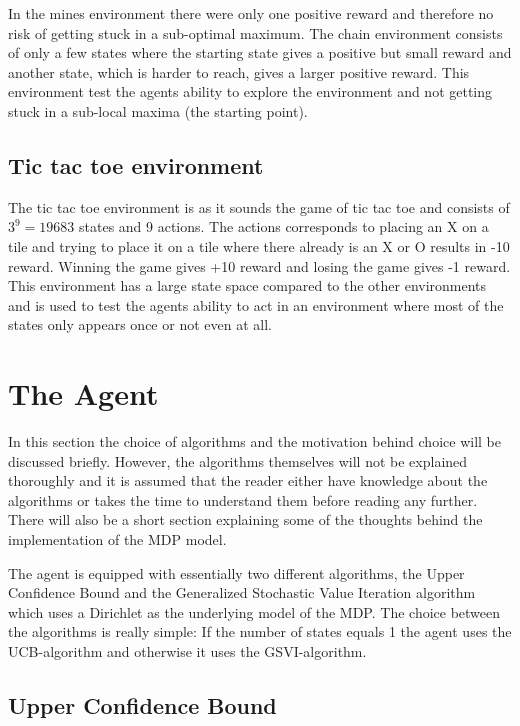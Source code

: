 \documentclass[11pt]{article}
\numberwithin{equation}{section}
\begin{document}
\begin{flushleft}
In the mines environment there were only one positive reward and therefore no risk of getting stuck in a sub-optimal maximum. The chain environment consists of only a few states where the starting state gives a positive but small reward and another state, which is harder to reach, gives a larger positive reward. This environment test the agents ability to explore the environment and not getting stuck in a sub-local maxima (the starting point).
\subsection{Tic tac toe environment}

The tic tac toe environment is as it sounds the game of tic tac toe and consists of $3^9=19683$ states and 9 actions. The actions corresponds to placing an X on a tile and trying to place it on a tile where there already is an X or O results in -10 reward. Winning the game gives +10 reward and losing the game gives -1 reward. This environment has a large state space compared to the other environments and is used to test the agents ability to act in an environment where most of the states only appears once or not even at all.

\section{The Agent}

In this section the choice of algorithms and the motivation behind choice will be discussed briefly. However, the algorithms themselves will not be explained thoroughly and it is assumed that the reader either have knowledge about the algorithms or takes the time to understand them before reading any further. There will also be a short section explaining some of the thoughts behind the implementation of the MDP model. \newline

The agent is equipped with essentially two different algorithms, the Upper Confidence Bound and the Generalized Stochastic Value Iteration algorithm which uses a Dirichlet as the underlying model of the MDP. The choice between the algorithms is really simple: If the number of states equals 1 the agent uses the UCB-algorithm and otherwise it uses the GSVI-algorithm.

\subsection{Upper Confidence Bound}


\end{flushleft}
\end{document}
